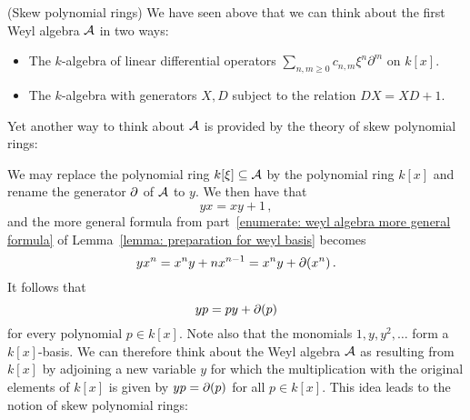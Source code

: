 \begin{remark}(Skew polynomial rings)
  \label{remark: skew polynomial rings}
  We have seen above that we can think about the first Weyl algebra $\operatorname{\mathcal{A}}$ in two ways:
  \begin{itemize}
    \item
      The $k$-algebra of linear differential operators $\sum_{n,m \geq 0} c_{n,m} \xi^n \partial^m$ on $k[x]$.
    \item
      The $k$-algebra with generators $X, D$ subject to the relation $D X = X D + 1$.
  \end{itemize}
  Yet another way to think about $\operatorname{\mathcal{A}}$ is provided by the theory of skew polynomial rings:
  
  We may replace the polynomial ring $k[\xi] \subseteq \operatorname{\mathcal{A}}$ by the polynomial ring $k[x]$ and rename the generator $\partial$ of $\operatorname{\mathcal{A}}$ to $y$.
  We then have that
  \[
    yx = xy + 1 \,,
  \]
  and the more general formula from part~\ref*{enumerate: weyl algebra more general formula} of Lemma~\ref{lemma: preparation for weyl basis} becomes
  \begin{equation}
    \label{equation: motivation skew polynomial ring}
      y x^n
    = x^n y + n x^{n-1}
    = x^n y + \partial(x^n) \,.
  \end{equation}
  It follows that
  \[
      y p
    = p y + \partial(p)
  \]
  for every polynomial $p \in k[x]$.
  Note also that the monomials $1, y, y^2, \dotsc$ form a $k[x]$-basis.
  We can therefore think about the Weyl algebra $\operatorname{\mathcal{A}}$ as resulting from $k[x]$ by adjoining a new variable $y$ for which the multiplication with the original elements of $k[x]$ is given by $y p = \partial(p)$ for all $p \in k[x]$.
  This idea leads to the notion of skew polynomial rings:
  

\end{remark}
